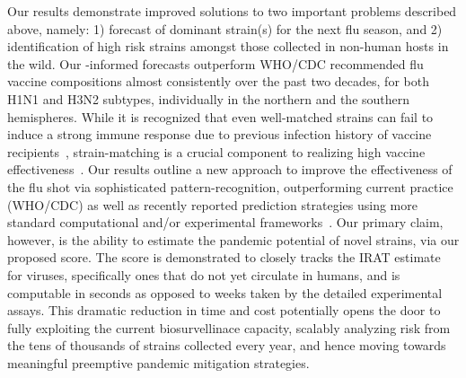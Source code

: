 \documentclass[onecolumn, compsoc,10pt]{IEEEtran}
\begin{document}

Our results demonstrate  improved solutions to  two important problems described above, namely: 1)  forecast of dominant strain(s) for the next flu season, and 2)  identification of high risk strains amongst those collected in non-human hosts in the wild. Our \enet-informed forecasts outperform  WHO/CDC recommended flu vaccine compositions almost consistently over the past two decades, for both H1N1 and H3N2 subtypes, individually in the northern and the southern hemispheres. While it is recognized that even well-matched strains can fail to induce a strong immune response due to previous infection history of vaccine recipients~\cite{cobey2018poor}, strain-matching is a crucial component to realizing high vaccine effectiveness~\cite{gouma2020antigenic}. Our results outline a new approach to improve the effectiveness of the flu shot via sophisticated  pattern-recognition, outperforming current practice (WHO/CDC) as well as  recently reported prediction strategies  using more standard computational and/or experimental frameworks~\cite{huddleston2020integrating,neher2014predicting}.
%
%
Our primary claim, however,  is the ability to estimate the pandemic potential of novel strains, via our proposed  \erisk score.  The \erisk score is demonstrated to closely tracks  the IRAT estimate for  \infl  viruses, specifically ones that do not yet circulate in humans, and is computable in seconds as opposed to weeks taken by the detailed experimental assays. This dramatic reduction in time and cost potentially opens the door to fully exploiting the  current biosurvellinace capacity, scalably analyzing risk from  the tens of thousands of strains collected every year, and hence moving towards   meaningful preemptive pandemic mitigation strategies.
\end{document}
